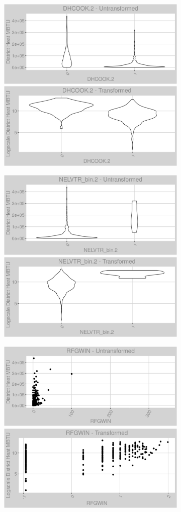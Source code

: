 \FloatBarrier
\newpage
\begin{figure}
\centering
\begin{subfigure}{1\textwidth}
\centering
\includegraphics[width=.49\textwidth, height=0.3\textheight]{Images/district_heat_var_original_9.png}
\includegraphics[width=.49\textwidth, height=0.3\textheight]{Images/district_heat_var_transformed_9.png}
\end{subfigure}
\begin{subfigure}{1\textwidth}
\centering
\includegraphics[width=.49\textwidth, height=0.3\textheight]{Images/district_heat_var_original_10.png}
\includegraphics[width=.49\textwidth, height=0.3\textheight]{Images/district_heat_var_transformed_10.png}
\end{subfigure}
\begin{subfigure}{1\textwidth}
\centering
\includegraphics[width=.49\textwidth, height=0.3\textheight]{Images/district_heat_var_original_11.png}
\includegraphics[width=.49\textwidth, height=0.3\textheight]{Images/district_heat_var_transformed_11.png}
\end{subfigure}
\end{figure}
